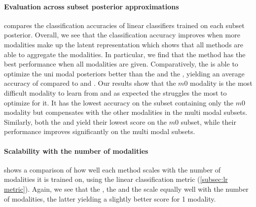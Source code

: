 \paragraph{Evaluation across subset posterior approximations}
 compares the classification accuracies of linear classifiers trained on each subset posterior.
Overall, we see that the classification accuracy improves when more modalities make up the latent representation which shows that all methods are able to aggregate the modalities.
In particular, we find that the  method has the best performance when all modalities are given.
Comparatively, the  is able to optimize the uni modal posteriors better than the  and the , yielding an average accuracy of  compared to  and .
Our results show that the $m0$ modality is the most difficult modality to learn from and as expected the  struggles the most to optimize for it.
It has the lowest accuracy on the subset containing only the $m0$ modality but compensates with the other modalities in the multi modal subsets.
Similarly, both the  and  yield their lowest score on the $m0$ subset, while their performance improves significantly on the multi modal subsets.


\paragraph{Scalability with the number of modalities}
 shows a comparison of how well each method scales with the number of modalities it is trained on, using the linear classification metric (\cref{subsec:lr metric}).
Again, we see that the , the  and the  scale equally well with the number of modalities, the latter yielding a slightly better score for 1 modality.

